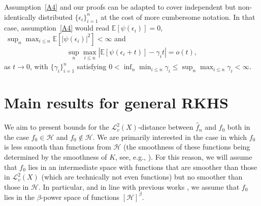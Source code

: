\documentclass[11pt]{article}
\theoremstyle{definition}
\theoremstyle{remark}
\begin{document}
Assumption~\ref{A4} and our proofs can be adapted to cover independent but non-identically distributed $\{\epsilon_i\}_{i=1}^n$ at the cost of more cumbersome notation.  In that case, assumption~\ref{A4} would read $\mathbb{E} [\psi(\epsilon_i)] = 0$, $ \ \sup_n \max_{i \leq n} \mathbb{E}[|\psi(\epsilon_i)|^2] < \infty$ and 
\begin{align*}
\sup_n \max_{i \leq n} \left| \mathbb{E}[\psi(\epsilon_i+t)] - \gamma_i t\right| = o(t),
\end{align*}
as $t \to 0$, with $\{\gamma_i\}_{i=1}^n$ satisfying $0<\inf_n \min_{i \leq n} \gamma_i \leq \sup_n \max_{i \leq n} \gamma_i < \infty$. 

\section{Main results for general RKHS}
\label{sec:rkhs}

We aim to present bounds for the $\mathcal{L}^2_v(X)$-distance between $\widehat{f}_n$ and $f_0$ both in the case $f_0 \in \mathcal{H}$ and $f_0 \notin \mathcal{H}$. We are primarily interested in the case in which $f_0$ is less smooth than functions from $\mathcal{H}$ (the smoothness of these functions being determined by the smoothness of $K$, see, e.g., \citep[Theorem 10.45]{Wend:2005}). For this reason, we will assume that $f_0$ lies in an intermediate space with functions that are smoother than those in $\mathcal{L}^2_v(X)$ (which are technically not even functions) but no smoother than those in $\mathcal{H}$. In particular, and in line with previous works \citep{St:2012,Fischer:2020, Zhang:2023}, we assume that $f_0$ lies in the $\beta$-power space of functions $[\mathcal{H}]^{\beta}$.
\end{document}
